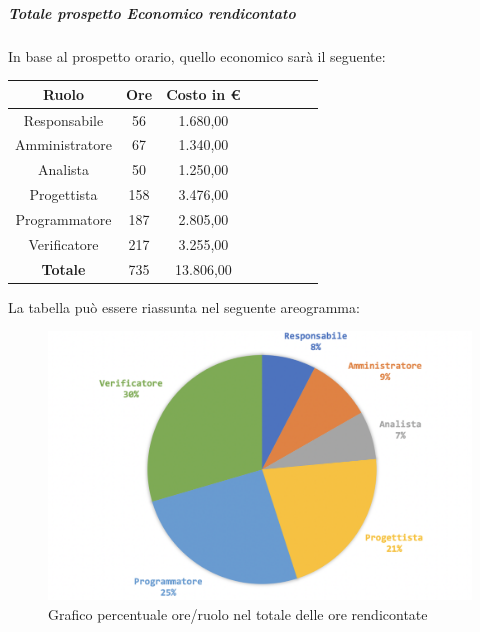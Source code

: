 				\subparagraph{Totale prospetto Economico rendicontato}
				In base al prospetto orario, quello economico sarà il seguente: 
				
				\begin{longtable}{|c|c|c|c|c|c|c|c}
					\hline
					\rowcolor{lighter-grayer}
					\textbf{Ruolo} & \textbf{Ore} & \textbf{Costo in € } \\
					\hline
					\endfirsthead
					
					\hline
					Responsabile 	    & 56 & 1.680,00\\
					\hline 
					\hline
					Amministratore	  & 67 & 1.340,00\\
					\hline
					\hline
					Analista 				& 50 & 1.250,00\\
					\hline
					\hline
					Progettista 		  & 158 & 3.476,00\\
					\hline
					\hline
					Programmatore 	 & 187 & 2.805,00\\
					\hline
					\hline
					Verificatore 		  & 217 & 3.255,00\\
					\hline
					\textbf{Totale} 	& 735 & 13.806,00\\
					\hline
				\end{longtable}
				\pagebreak
				
				La tabella può essere riassunta nel seguente areogramma:
				\begin{figure}[H]
					\centering
					\includegraphics[width=0.8\linewidth]{./images/totOreRed2.png}
					\caption{Grafico percentuale ore/ruolo nel totale delle ore rendicontate}
					\label{fig:grafico costi ruolo fase totale ore rendicontate}
				\end{figure}
				
				
		
	
	